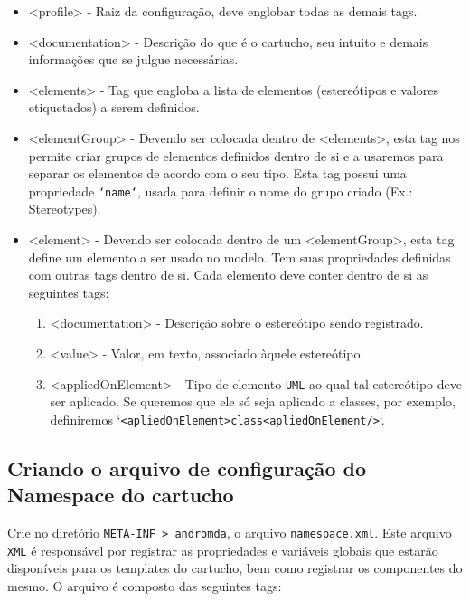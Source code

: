 \begin{enumerate}
\begin{itemize}
  \item <profile> - Raiz da configuração, deve englobar todas as demais tags.
  \item <documentation> - Descrição do que é o cartucho, seu intuito e demais
  informações que se julgue necessárias.
  \item <elements> - Tag que engloba a lista de elementos (estereótipos e
  valores etiquetados) a serem definidos.
  \item <elementGroup> - Devendo ser colocada dentro de <elements>, esta tag
  nos permite criar grupos de elementos definidos dentro de si e a usaremos para
  separar os elementos de acordo com o seu tipo. Esta tag possui uma propriedade
  \texttt{`name`}, usada para definir o nome do grupo criado (Ex.: Stereotypes).
  \item <element> - Devendo ser colocada dentro de um <elementGroup>, esta tag
  define um elemento a ser usado no modelo. Tem suas propriedades definidas com
  outras tags dentro de si. Cada elemento deve conter dentro de si as seguintes
  tags:
  \begin{enumerate}
    \item <documentation> - Descrição sobre o estereótipo sendo registrado.
    \item <value> - Valor, em texto, associado àquele estereótipo.
    \item <appliedOnElement> - Tipo de elemento \texttt{UML} ao qual tal
    estereótipo deve ser aplicado. Se queremos que ele só seja aplicado a
    classes, por exemplo, definiremos 
    `\texttt{<apliedOnElement>class<apliedOnElement/>}`.
  \end{enumerate}
\end{itemize}

\subsection{Criando o arquivo de configuração do Namespace do cartucho}
Crie no diretório \texttt{META-INF > andromda}, o arquivo
\texttt{namespace.xml}. Este arquivo \texttt{XML} é responsável por registrar as
propriedades e variáveis globais que estarão disponíveis para os templates do
cartucho, bem como registrar os componentes do mesmo. O arquivo é composto das
seguintes tags:


\end{enumerate}
